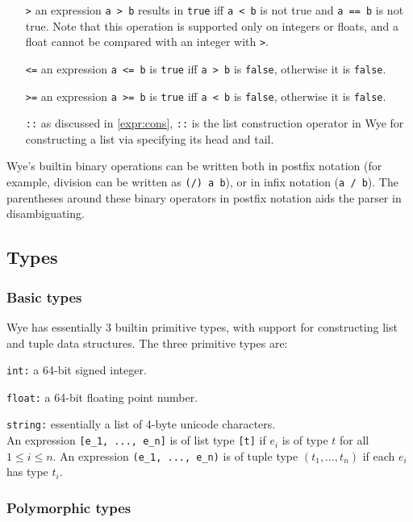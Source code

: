 \documentclass[a4paper, 12pt]{article}
\begin{document}
\begin{itemize}
\item[\texttt{>}] an expression \texttt{a > b} results in \texttt{true} iff \texttt{a < b} is not true and \texttt{a == b} is not true. Note that this operation is supported only on integers or floats, and a float cannot be compared with an integer with \texttt{>}.
\item[\texttt{<=}] an expression \texttt{a <= b} is \texttt{true} iff \texttt{a > b} is \texttt{false}, otherwise it is \texttt{false}.
\item[\texttt{>=}] an expression \texttt{a >= b} is \texttt{true} iff \texttt{a < b} is \texttt{false}, otherwise it is \texttt{false}.
\item[\texttt{::}] as discussed in \ref{expr:cons}, \texttt{::} is the list construction operator in Wye for constructing a list via specifying its head and tail.
\end{itemize}

Wye's builtin binary operations can be written both in postfix notation (for example, division can be written as \texttt{(/) a b}), or in infix notation (\texttt{a / b}). The parentheses around these binary operators in postfix notation aids the parser in disambiguating.

\subsection{Types}

\subsubsection{Basic types}

Wye has essentially 3 builtin primitive types, with support for constructing list and tuple data structures. The three primitive types are:

\texttt{int:} a 64-bit signed integer.

\texttt{float:} a 64-bit floating point number.

\texttt{string:} essentially a list of 4-byte unicode characters.\\
An expression \texttt{[e\_1, ..., e\_n]} is of list type \texttt{[t]} if $e_i$ is of type $t$ for all $1\leq i\leq n$. An expression \texttt{(e\_1, ..., e\_n)} is of tuple type $(t_1, ..., t_n)$ if each $e_i$ has type $t_i$.

\subsubsection{Polymorphic types}
\end{document}
